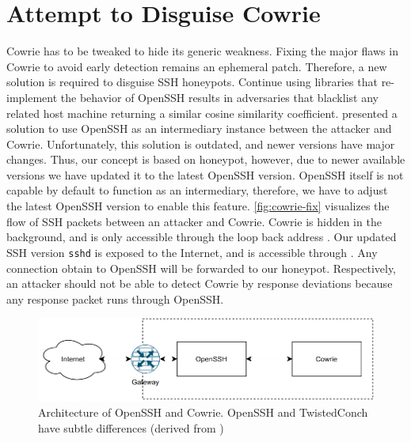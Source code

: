 \begin{figure}
    
\end{figure}

\begin{figure}
    
\end{figure}

\section{Attempt to Disguise Cowrie}

Cowrie has to be tweaked to hide its generic weakness.
Fixing the major flaws in Cowrie to avoid early detection remains an ephemeral patch.
Therefore, a new solution is required to disguise SSH honeypots.
Continue using libraries that re-implement the behavior of OpenSSH results in adversaries that blacklist any related host machine returning a similar cosine similarity coefficient.
\citet{vetterl2020} presented a solution to use OpenSSH as an intermediary instance between the attacker and Cowrie.
Unfortunately, this solution is outdated, and newer versions have major changes.
Thus, our concept is based on \citet{vetterl2020} honeypot, however, due to newer available versions we have updated it to the latest OpenSSH version.
OpenSSH itself is not capable by default to function as an intermediary, therefore, we have to adjust the latest OpenSSH version to enable this feature.
\autoref{fig:cowrie-fix} visualizes the flow of SSH packets between an attacker and Cowrie.
Cowrie is hidden in the background, and is only accessible through the loop back address .
Our updated SSH version \verb|sshd| is exposed to the Internet, and is accessible through .
Any connection obtain to OpenSSH will be forwarded to our honeypot.
Respectively, an attacker should not be able to detect Cowrie by response deviations because any response packet runs through OpenSSH.

\begin{figure}[ht]
    \centering
    \includegraphics{figures/sshd-honeypot.pdf}
    \caption[Architecture of OpenSSH and Cowrie]{Architecture of OpenSSH and Cowrie. OpenSSH and TwistedConch have subtle differences (derived from \cite{vetterl2020})}
    \label{fig:cowrie-fix}
\end{figure}

